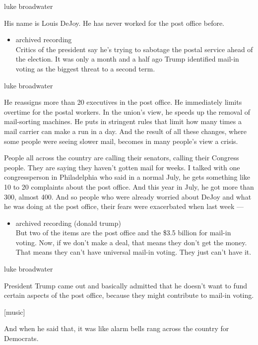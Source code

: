 luke broadwater

His name is Louis DeJoy. He has never worked for the post office before.

\begin{itemize}
\tightlist
\item
  archived recording\\
  Critics of the president say he's trying to sabotage the postal
  service ahead of the election. It was only a month and a half ago
  Trump identified mail-in voting as the biggest threat to a second
  term.
\end{itemize}

luke broadwater

He reassigns more than 20 executives in the post office. He immediately
limits overtime for the postal workers. In the union's view, he speeds
up the removal of mail-sorting machines. He puts in stringent rules that
limit how many times a mail carrier can make a run in a day. And the
result of all these changes, where some people were seeing slower mail,
becomes in many people's view a crisis.

People all across the country are calling their senators, calling their
Congress people. They are saying they haven't gotten mail for weeks. I
talked with one congressperson in Philadelphia who said in a normal
July, he gets something like 10 to 20 complaints about the post office.
And this year in July, he got more than 300, almost 400. And so people
who were already worried about DeJoy and what he was doing at the post
office, their fears were exacerbated when last week ---

\begin{itemize}
\tightlist
\item
  archived recording (donald trump)\\
  But two of the items are the post office and the \$3.5 billion for
  mail-in voting. Now, if we don't make a deal, that means they don't
  get the money. That means they can't have universal mail-in voting.
  They just can't have it.
\end{itemize}

luke broadwater

President Trump came out and basically admitted that he doesn't want to
fund certain aspects of the post office, because they might contribute
to mail-in voting.

{[}music{]}

And when he said that, it was like alarm bells rang across the country
for Democrats.

